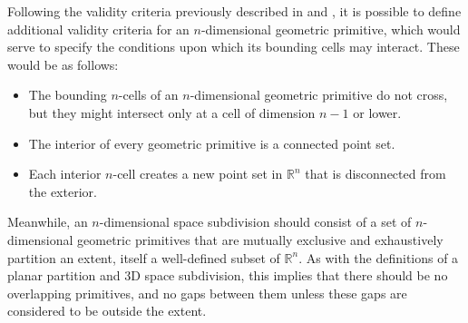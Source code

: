
Following the validity criteria previously described in  and , it is possible to define additional validity criteria for an $n$-dimensional geometric primitive, which would serve to specify the conditions upon which its bounding cells may interact.
These would be as follows:

\begin{itemize}
\item The bounding $n$-cells of an $n$-dimensional geometric primitive do not cross, but they might intersect only at a cell of dimension $n-1$ or lower.
\item The interior of every geometric primitive is a connected point set.
\item Each interior $n$-cell creates a new point set in $\mathbb{R}^n$ that is disconnected from the exterior.
\end{itemize}

Meanwhile, an $n$-dimensional space subdivision should consist of a set of $n$-dimensional geometric primitives that are mutually exclusive and exhaustively partition an extent, itself a well-defined subset of $\mathbb{R}^n$.
As with the definitions of a planar partition and 3D space subdivision, this implies that there should be no overlapping primitives, and no gaps between them unless these gaps are considered to be outside the extent.
